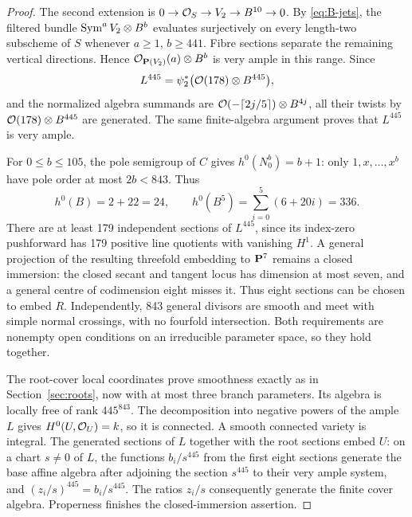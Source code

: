 \begin{proof}
The second extension is $0\to\mathcal O_S\to V_2\to B^{10}\to0$. By \eqref{eq:B-jets}, the filtered bundle $\operatorname{Sym}^aV_2\otimes B^b$ evaluates surjectively on every length-two subscheme of $S$ whenever $a\ge1$, $b\ge441$. Fibre sections separate the remaining vertical directions. Hence $\mathcal O_{\mathbf P(V_2)}(a)\otimes B^b$ is very ample in this range. Since
\[
 L^{445}=\psi_2^*\bigl(\mathcal O(178)\otimes B^{445}\bigr),
\]
and the normalized algebra summands are
$\mathcal O(-\lceil2j/5\rceil)\otimes B^{4j}$, all their twists by $\mathcal O(178)\otimes B^{445}$ are generated. The same finite-algebra argument proves that $L^{445}$ is very ample.

For $0\le b\le105$, the pole semigroup of $C$ gives $h^0(N_0^b)=b+1$: only $1,x,\ldots,x^b$ have pole order at most $2b<843$. Thus
\[
 h^0(B)=2+22=24,\qquad
 h^0(B^5)=\sum_{i=0}^5(6+20i)=336.
\]
There are at least 179 independent sections of $L^{445}$, since its index-zero pushforward has 179 positive line quotients with vanishing $H^1$. A general projection of the resulting threefold embedding to $\mathbf P^7$ remains a closed immersion: the closed secant and tangent locus has dimension at most seven, and a general centre of codimension eight misses it. Thus eight sections can be chosen to embed $R$. Independently, 843 general divisors are smooth and meet with simple normal crossings, with no fourfold intersection. Both requirements are nonempty open conditions on an irreducible parameter space, so they hold together.

The root-cover local coordinates prove smoothness exactly as in Section~\ref{sec:roots}, now with at most three branch parameters. Its algebra is locally free of rank $445^{843}$. The decomposition into negative powers of the ample $L$ gives $H^0(U,\mathcal O_U)=k$, so it is connected. A smooth connected variety is integral. The generated sections of $L$ together with the root sections embed $U$: on a chart $s\ne0$ of $L$, the functions $b_i/s^{445}$ from the first eight sections generate the base affine algebra after adjoining the section $s^{445}$ to their very ample system, and $(z_i/s)^{445}=b_i/s^{445}$. The ratios $z_i/s$ consequently generate the finite cover algebra. Properness finishes the closed-immersion assertion.


\end{proof}
